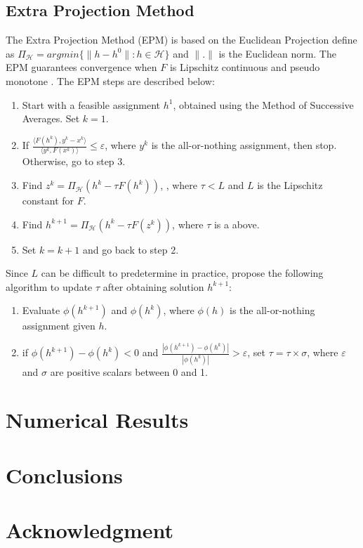 \documentclass[conference]{IEEEtran}
\renewcommand{\:}{\mathrel{\coloneqq}}
\renewcommand{\=}{\ensuremath{\eqqcolon}}
\renewcommand{\epsilon}{\varepsilon}
\newcommand{\0}{\ensuremath{\boldsymbol{0}}}
\begin{document}
\subsection{Extra Projection Method}
The Extra Projection Method (EPM) is based on the Euclidean Projection define as $\Pi_\mathcal{H} = argmin\{\lVert h-h^0\rVert:h \in\mathcal{H} \}$ and $\lVert.\rVert$ is the Euclidean norm. The EPM guarantees convergence when $F$ is Lipschitz continuous and pseudo monotone \cite{nie2010solving}. The EPM steps are described below:
\begin{enumerate}
\item Start with a feasible assignment $h^1$, obtained using the Method of Successive Averages. Set $k=1$.
\item If ${\frac {\langle F(h^k),y^k-x^k \rangle} {\langle y^k, F(x^k)\rangle}} \leq \epsilon$, where $y^k$ is the all-or-nothing assignment, then stop. Otherwise, go to step 3.
\item Find $z^k = \Pi_\mathcal{H}(h^k - \tau F(h^k))$, , where $\tau < L$ and $L$ is the Lipschitz constant for $F$.
\item Find $h^{k+1} = \Pi_\mathcal{H}(h^k - \tau F(z^k))$, where $\tau$ is a above.
\item Set $k = k+1$ and go back to step 2.
\end{enumerate}

Since $L$ can be difficult to predetermine in practice, \cite{nie2010solving} propose the following algorithm to update $\tau$ after obtaining solution $h^{k+1}$:
\begin{enumerate}
    \item Evaluate $\phi(h^{k+1})$ and $\phi(h^k)$, where $\phi(h)$ is the all-or-nothing assignment given $h$.
    \item if $\phi(h^{k+1})-\phi(h^k) < 0$ and $\frac{|\phi(h^{k+1})-\phi(h^k)|}{|\phi(h^k)|}> \epsilon$, set $\tau = \tau \times \sigma$, where $\epsilon$ and $\sigma$ are positive scalars between 0 and 1.
\end{enumerate}

\section{Numerical Results}

\section{Conclusions}\label{sec:concl}

\section*{Acknowledgment}




\end{document}
